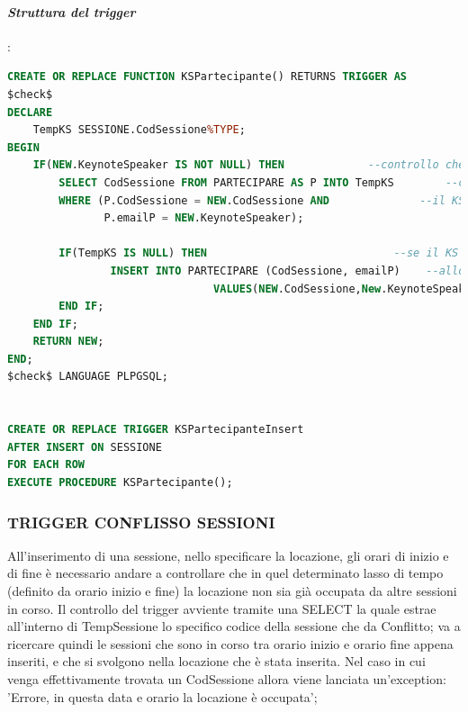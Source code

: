 \documentclass[a4page]{article}
\begin{document}
\paragraph{\textit{Struttura del trigger}}:	
\begin{lstlisting}[language=SQL,
        deletekeywords={IDENTITY,INT},
        morekeywords={clustered},    
        framesep=10pt,
        framextopmargin=10pt]
CREATE OR REPLACE FUNCTION KSPartecipante() RETURNS TRIGGER AS
$check$
DECLARE 
	TempKS SESSIONE.CodSessione%TYPE;
BEGIN
	IF(NEW.KeynoteSpeaker IS NOT NULL) THEN				--controllo che sia stato realmente inserito un KS per la sessione
		SELECT CodSessione FROM PARTECIPARE AS P INTO TempKS		--controllo che nei partecipanti non ci sia gia' 
		WHERE (P.CodSessione = NEW.CodSessione AND				--il KS della sessione
			   P.emailP = NEW.KeynoteSpeaker);
		
		IF(TempKS IS NULL) THEN								--se il KS non e' presente tra i partecipanti,
				INSERT INTO PARTECIPARE (CodSessione, emailP) 	 --allora lo inserisco
								VALUES(NEW.CodSessione,New.KeynoteSpeaker); 
		END IF;
	END IF;
	RETURN NEW;
END;
$check$ LANGUAGE PLPGSQL;


CREATE OR REPLACE TRIGGER KSPartecipanteInsert
AFTER INSERT ON SESSIONE
FOR EACH ROW
EXECUTE PROCEDURE KSPartecipante();        
\end{lstlisting}
\newpage
\subsubsection{TRIGGER CONFLISSO SESSIONI}
All'inserimento di una sessione, nello specificare la locazione, gli orari di inizio e di fine è necessario
andare a controllare che in quel determinato lasso di tempo (definito da orario inizio e fine) la locazione non
sia già occupata da altre sessioni in corso. Il controllo del trigger avviente tramite una SELECT la quale estrae all'interno di TempSessione lo specifico codice della sessione che da Conflitto; va a ricercare quindi le sessioni che sono in corso tra orario inizio e  orario fine appena inseriti, e che si svolgono nella locazione che è stata inserita. Nel caso in cui venga effettivamente trovata un CodSessione allora viene lanciata un'exception:
'Errore, in questa data e orario la locazione è occupata';
\vspace{1cm}
\end{document}
